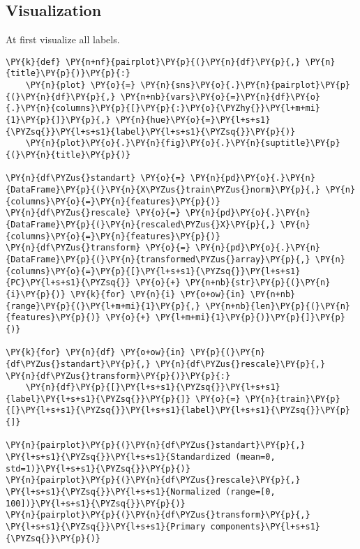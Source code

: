 \subsection*{Visualization}

At first visualize all labels.

    \begin{tcolorbox}[breakable, size=fbox, boxrule=1pt, pad at break*=1mm,colback=cellbackground, colframe=cellborder]
\begin{Verbatim}[commandchars=\\\{\}]
\PY{k}{def} \PY{n+nf}{pairplot}\PY{p}{(}\PY{n}{df}\PY{p}{,} \PY{n}{title}\PY{p}{)}\PY{p}{:}
    \PY{n}{plot} \PY{o}{=} \PY{n}{sns}\PY{o}{.}\PY{n}{pairplot}\PY{p}{(}\PY{n}{df}\PY{p}{,} \PY{n+nb}{vars}\PY{o}{=}\PY{n}{df}\PY{o}{.}\PY{n}{columns}\PY{p}{[}\PY{p}{:}\PY{o}{\PYZhy{}}\PY{l+m+mi}{1}\PY{p}{]}\PY{p}{,} \PY{n}{hue}\PY{o}{=}\PY{l+s+s1}{\PYZsq{}}\PY{l+s+s1}{label}\PY{l+s+s1}{\PYZsq{}}\PY{p}{)}
    \PY{n}{plot}\PY{o}{.}\PY{n}{fig}\PY{o}{.}\PY{n}{suptitle}\PY{p}{(}\PY{n}{title}\PY{p}{)}

\PY{n}{df\PYZus{}standart} \PY{o}{=} \PY{n}{pd}\PY{o}{.}\PY{n}{DataFrame}\PY{p}{(}\PY{n}{X\PYZus{}train\PYZus{}norm}\PY{p}{,} \PY{n}{columns}\PY{o}{=}\PY{n}{features}\PY{p}{)} 
\PY{n}{df\PYZus{}rescale} \PY{o}{=} \PY{n}{pd}\PY{o}{.}\PY{n}{DataFrame}\PY{p}{(}\PY{n}{rescaled\PYZus{}X}\PY{p}{,} \PY{n}{columns}\PY{o}{=}\PY{n}{features}\PY{p}{)}
\PY{n}{df\PYZus{}transform} \PY{o}{=} \PY{n}{pd}\PY{o}{.}\PY{n}{DataFrame}\PY{p}{(}\PY{n}{transformed\PYZus{}array}\PY{p}{,} \PY{n}{columns}\PY{o}{=}\PY{p}{[}\PY{l+s+s1}{\PYZsq{}}\PY{l+s+s1}{PC}\PY{l+s+s1}{\PYZsq{}} \PY{o}{+} \PY{n+nb}{str}\PY{p}{(}\PY{n}{i}\PY{p}{)} \PY{k}{for} \PY{n}{i} \PY{o+ow}{in} \PY{n+nb}{range}\PY{p}{(}\PY{l+m+mi}{1}\PY{p}{,} \PY{n+nb}{len}\PY{p}{(}\PY{n}{features}\PY{p}{)} \PY{o}{+} \PY{l+m+mi}{1}\PY{p}{)}\PY{p}{]}\PY{p}{)}

\PY{k}{for} \PY{n}{df} \PY{o+ow}{in} \PY{p}{(}\PY{n}{df\PYZus{}standart}\PY{p}{,} \PY{n}{df\PYZus{}rescale}\PY{p}{,} \PY{n}{df\PYZus{}transform}\PY{p}{)}\PY{p}{:}
    \PY{n}{df}\PY{p}{[}\PY{l+s+s1}{\PYZsq{}}\PY{l+s+s1}{label}\PY{l+s+s1}{\PYZsq{}}\PY{p}{]} \PY{o}{=} \PY{n}{train}\PY{p}{[}\PY{l+s+s1}{\PYZsq{}}\PY{l+s+s1}{label}\PY{l+s+s1}{\PYZsq{}}\PY{p}{]}

\PY{n}{pairplot}\PY{p}{(}\PY{n}{df\PYZus{}standart}\PY{p}{,} \PY{l+s+s1}{\PYZsq{}}\PY{l+s+s1}{Standardized (mean=0, std=1)}\PY{l+s+s1}{\PYZsq{}}\PY{p}{)}
\PY{n}{pairplot}\PY{p}{(}\PY{n}{df\PYZus{}rescale}\PY{p}{,} \PY{l+s+s1}{\PYZsq{}}\PY{l+s+s1}{Normalized (range=[0, 100])}\PY{l+s+s1}{\PYZsq{}}\PY{p}{)}
\PY{n}{pairplot}\PY{p}{(}\PY{n}{df\PYZus{}transform}\PY{p}{,} \PY{l+s+s1}{\PYZsq{}}\PY{l+s+s1}{Primary components}\PY{l+s+s1}{\PYZsq{}}\PY{p}{)}
\end{Verbatim}
\end{tcolorbox}

